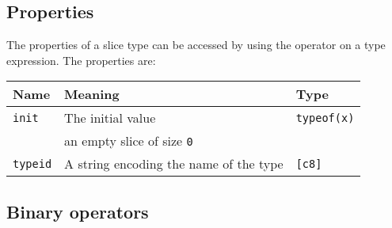 \subsection{Properties}

The properties of a slice type can be accessed by using the \token{::} operator on a type expression. The properties are:

\begin{center}\begin{adjustbox}{max width=\linewidth}
  \begin{tabular}{|l|ll|}
    \hline
    Name & Meaning & Type\\
    \hline
    \hline
    \texttt{init} & The initial value & \texttt{typeof(x)}\\
    & an empty slice of size \texttt{0} & \\
    \hline
    \texttt{typeid} & A string encoding the name of the type & \texttt{[c8]} \\
    \hline
  \end{tabular}
\end{adjustbox}\end{center}

\subsection{Binary operators}

